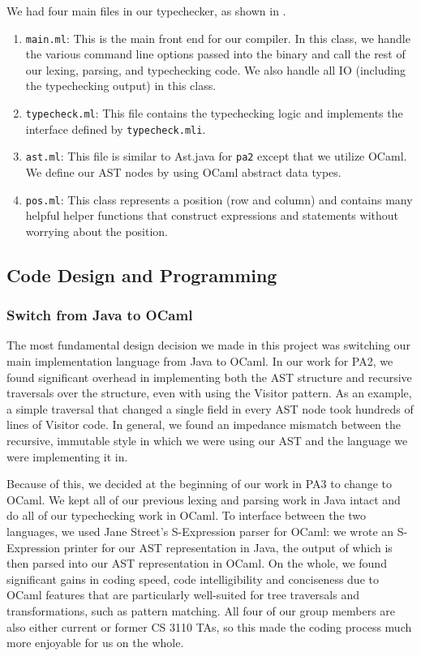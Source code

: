 \documentclass{hw}
\begin{document}
We had four main files in our typechecker, as shown in .
\begin{enumerate}
  \item{\texttt{main.ml}:}
    This is the main front end for our compiler. In this class, we handle the
    various command line options passed into the binary and call the rest of
    our lexing, parsing, and typechecking code. We also handle all IO (including the typechecking
    output) in this class.

  \item{\texttt{typecheck.ml}:}
    This file contains the typechecking logic and implements the interface defined by \texttt{typecheck.mli}.
    
  \item{\texttt{ast.ml}:}
    This file is similar to Ast.java for \texttt{pa2} except that we utilize OCaml. We define our AST nodes by using OCaml abstract data types.

  \item{\texttt{pos.ml}:}
    This class represents a position (row and column) and contains many helpful helper functions that construct expressions and statements without worrying about the position.

\end{enumerate}

\subsection{Code Design and Programming}
\subsubsection{Switch from Java to OCaml}
The most fundamental design decision we made in this project was switching our
main implementation language from Java to OCaml. In our work for PA2,
we found significant overhead in implementing both the AST structure and recursive
traversals over the structure, even with using the Visitor pattern. As an example,
a simple traversal that changed a single field in every AST node took hundreds of lines
of Visitor code. In general, we found an impedance mismatch between the recursive,
immutable style in which we were using our AST and the language we were implementing
it in. 

Because of this, we decided at the beginning of our work in PA3 to change to OCaml.
We kept all of our previous lexing and parsing work in Java intact and do all of our
typechecking work in OCaml. To interface between the two languages, we used Jane Street's
S-Expression parser for OCaml: we wrote an S-Expression printer for our AST representation
in Java, the output of which is then parsed into our AST representation in OCaml. On the
whole, we found significant gains in coding speed, code intelligibility and conciseness
due to OCaml features that are particularly well-suited for tree traversals and transformations, such as pattern matching. All four of our group members are also either current or former
CS 3110 TAs, so this made the coding process much more enjoyable for us on the whole.
\end{document}
